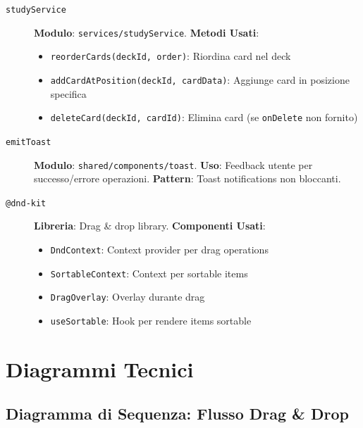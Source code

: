 \documentclass[11pt,a4paper]{article}
\begin{document}
\begin{description}
    \item[\texttt{studyService}] \textbf{Modulo}: \texttt{services/studyService}. \textbf{Metodi Usati}:
    \begin{itemize}
        \item \texttt{reorderCards(deckId, order)}: Riordina card nel deck
        \item \texttt{addCardAtPosition(deckId, cardData)}: Aggiunge card in posizione specifica
        \item \texttt{deleteCard(deckId, cardId)}: Elimina card (se \texttt{onDelete} non fornito)
    \end{itemize}
    
    \item[\texttt{emitToast}] \textbf{Modulo}: \texttt{shared/components/toast}. \textbf{Uso}: Feedback utente per successo/errore operazioni. \textbf{Pattern}: Toast notifications non bloccanti.
    
    \item[\texttt{@dnd-kit}] \textbf{Libreria}: Drag \& drop library. \textbf{Componenti Usati}:
    \begin{itemize}
        \item \texttt{DndContext}: Context provider per drag operations
        \item \texttt{SortableContext}: Context per sortable items
        \item \texttt{DragOverlay}: Overlay durante drag
        \item \texttt{useSortable}: Hook per rendere items sortable
    \end{itemize}
\end{description}


\section{Diagrammi Tecnici}

\subsection{Diagramma di Sequenza: Flusso Drag \& Drop}
\end{document}
